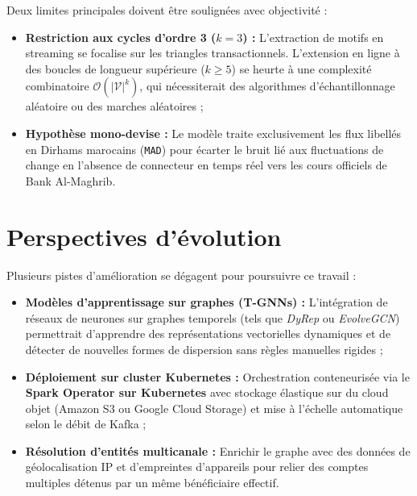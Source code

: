 Deux limites principales doivent être soulignées avec objectivité :
\begin{itemize}
    \item \textbf{Restriction aux cycles d'ordre 3 ($k=3$) :} L'extraction de motifs en streaming se focalise sur les triangles transactionnels. L'extension en ligne à des boucles de longueur supérieure ($k \ge 5$) se heurte à une complexité combinatoire $\mathcal{O}(|\mathcal{V}|^k)$, qui nécessiterait des algorithmes d'échantillonnage aléatoire ou des marches aléatoires ;
    \item \textbf{Hypothèse mono-devise :} Le modèle traite exclusivement les flux libellés en Dirhams marocains (\texttt{MAD}) pour écarter le bruit lié aux fluctuations de change en l'absence de connecteur en temps réel vers les cours officiels de Bank Al-Maghrib.
\end{itemize}

\section{Perspectives d'évolution}

Plusieurs pistes d'amélioration se dégagent pour poursuivre ce travail :
\begin{itemize}
    \item \textbf{Modèles d'apprentissage sur graphes (T-GNNs) :} L'intégration de réseaux de neurones sur graphes temporels (tels que \textit{DyRep} ou \textit{EvolveGCN}) permettrait d'apprendre des représentations vectorielles dynamiques et de détecter de nouvelles formes de dispersion sans règles manuelles rigides ;
    \item \textbf{Déploiement sur cluster Kubernetes :} Orchestration conteneurisée via le \textbf{Spark Operator sur Kubernetes} avec stockage élastique sur du cloud objet (Amazon S3 ou Google Cloud Storage) et mise à l'échelle automatique selon le débit de Kafka ;
    \item \textbf{Résolution d'entités multicanale :} Enrichir le graphe avec des données de géolocalisation IP et d'empreintes d'appareils pour relier des comptes multiples détenus par un même bénéficiaire effectif.
\end{itemize}

\newpage
